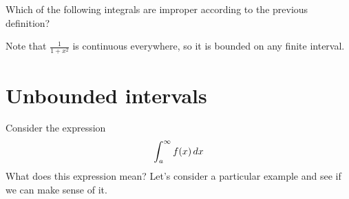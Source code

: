 \documentclass{ximera}
\begin{document}
\begin{question}
  Which of the following integrals are improper according to the previous definition?
  \begin{selectAll}
  \end{selectAll}

\begin{feedback}
  Note that $\frac{1}{1+x^2}$ is continuous everywhere, so it is bounded on any finite interval.
\end{feedback}
\end{question}





\section{Unbounded intervals}


Consider the expression
\[
\int_{a}^{\infty} f(x) \mathop{}\!d x
\]
What does this expression mean?  Let's consider a particular example and see if we can make sense of it.
\end{document}
